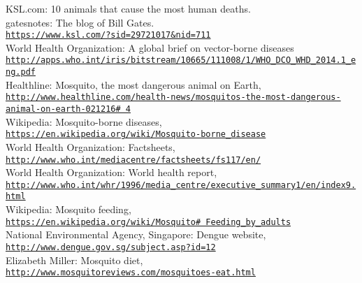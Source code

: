 \documentclass[11pt]{exam}
\begin{document}
\begin{thebibliography}{28}
KSL.com: 10 animals that cause the most human deaths. \\
gatesnotes: The blog of Bill Gates. 
\\\texttt{\url{https://www.ksl.com/?sid=29721017&nid=711}} \\

World Health Organization: A global brief on vector-borne diseases
\\\texttt{\url{http://apps.who.int/iris/bitstream/10665/111008/1/WHO_DCO_WHD_2014.1_eng.pdf}}\\
 
Healthline: Mosquito, the most dangerous animal on Earth,
\\\texttt{\url{http://www.healthline.com/health-news/mosquitos-the-most-dangerous-animal-on-earth-021216\# 4}} \\
 
Wikipedia: Mosquito-borne diseases,
\\\texttt{\url{https://en.wikipedia.org/wiki/Mosquito-borne_disease}} \\
 
World Health Organization: Factsheets,
\\\texttt{\url{http://www.who.int/mediacentre/factsheets/fs117/en/}}\\
 
World Health Organization: World health report,
\\\texttt{\url{http://www.who.int/whr/1996/media_centre/executive_summary1/en/index9.html}} \\
 
Wikipedia: Mosquito feeding,
\\\texttt{\url{https://en.wikipedia.org/wiki/Mosquito\# Feeding_by_adults}}\\
 
National Environmental Agency, Singapore: Dengue website, 
\\\texttt{\url{http://www.dengue.gov.sg/subject.asp?id=12}} \\

Elizabeth Miller: Mosquito diet, 
\\\texttt{\url{http://www.mosquitoreviews.com/mosquitoes-eat.html}}\\
 

\end{thebibliography}
\end{document}
